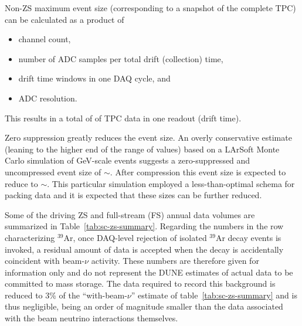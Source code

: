 Non-ZS maximum event size (corresponding to a snapshot of the complete
TPC) can be calculated as a product of %
\begin{itemize}
\item channel count,
\item number of ADC samples per total drift (collection) time,
\item drift time windows in one DAQ cycle, and
\item ADC resolution.
\end{itemize}

This results in a total of \dunefsreadoutsize %
of TPC data in one readout (drift time). 

Zero suppression greatly reduces the event size.  An overly
conservative estimate (leaning to the higher end of the range of
values) based on a LArSoft Monte Carlo simulation of GeV-scale events
suggests a zero-suppressed and uncompressed event size of
$\sim$\beameventsize.  After compression this event size is expected
to reduce to $\sim$\beameventsizecompressed.  This particular simulation
employed a less-than-optimal schema for packing data and it is
expected that these sizes can be further reduced.

Some of the driving ZS and full-stream (FS) annual
data volumes are summarized in Table~\ref{tab:sc-zs-summary}.  Regarding the 
numbers in the row characterizing $^{39}$Ar, once DAQ-level rejection of isolated $^{39}$Ar decay 
events is invoked, a residual amount of data is accepted when the decay is accidentally
coincident with beam-$\nu$ activity. These numbers are therefore given for information only and do not 
represent the DUNE estimates of actual data to be committed to mass storage.
The data required to record this background is reduced to 3\% of the
``with-beam-$\nu$'' estimate of table~\ref{tab:sc-zs-summary} and is
thus negligible, being an order of magnitude smaller than the data
associated with the beam neutrino interactions themselves.




